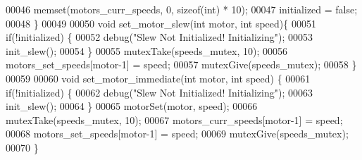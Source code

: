\begin{DoxyCode}
00046   memset(motors_curr_speeds, 0, \textcolor{keyword}{sizeof}(\textcolor{keywordtype}{int}) * 10);
00047   initialized = \textcolor{keyword}{false};
00048 \}
00049 
00050 \textcolor{keywordtype}{void} set_motor_slew(\textcolor{keywordtype}{int} motor, \textcolor{keywordtype}{int} speed)\{
00051   \textcolor{keywordflow}{if}(!initialized) \{
00052     debug(\textcolor{stringliteral}{"Slew Not Initialized! Initializing"});
00053     init_slew();
00054   \}
00055   mutexTake(speeds_mutex, 10);
00056   motors_set_speeds[motor-1] = speed;
00057   mutexGive(speeds_mutex);
00058 \}
00059 
00060 \textcolor{keywordtype}{void} set_motor_immediate(\textcolor{keywordtype}{int} motor, \textcolor{keywordtype}{int} speed) \{
00061   \textcolor{keywordflow}{if}(!initialized) \{
00062     debug(\textcolor{stringliteral}{"Slew Not Initialized! Initializing"});
00063     init_slew();
00064   \}
00065   motorSet(motor, speed);
00066   mutexTake(speeds_mutex, 10);
00067   motors_curr_speeds[motor-1] = speed;
00068   motors_set_speeds[motor-1] = speed;
00069   mutexGive(speeds_mutex);
00070 \}
\end{DoxyCode}
